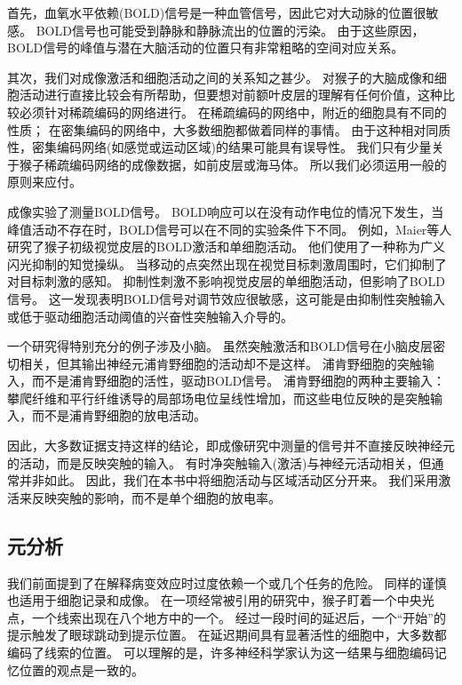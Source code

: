 \par
首先，血氧水平依赖(BOLD)信号是一种血管信号，因此它对大动脉的位置很敏感。
BOLD信号也可能受到静脉和静脉流出的位置的污染\cite{turner2002much}。
由于这些原因，BOLD信号的峰值与潜在大脑活动的位置只有非常粗略的空间对应关系\cite{kim2004spatial}。

\par
其次，我们对成像激活和细胞活动之间的关系知之甚少。
对猴子的大脑成像和细胞活动进行直接比较会有所帮助，但要想对前额叶皮层的理解有任何价值，这种比较必须针对稀疏编码的网络进行。
在稀疏编码的网络中，附近的细胞具有不同的性质；
在密集编码的网络中，大多数细胞都做着同样的事情。
由于这种相对同质性，密集编码网络(如感觉或运动区域)的结果可能具有误导性。
我们只有少量关于猴子稀疏编码网络的成像数据，如前皮层或海马体\cite{nakahara2002functional,orban2004comparative}。
所以我们必须运用一般的原则来应付。

\par
成像实验了测量BOLD信号。
BOLD响应可以在没有动作电位的情况下发生\cite{logothetis2002neural}，当峰值活动不存在时，BOLD信号可以在不同的实验条件下不同。
例如，Maier等人\cite{maier2008divergence}研究了猴子初级视觉皮层的BOLD激活和单细胞活动。
他们使用了一种称为广义闪光抑制的知觉操纵。
当移动的点突然出现在视觉目标刺激周围时，它们抑制了对目标刺激的感知。
抑制性刺激不影响视觉皮层的单细胞活动，但影响了BOLD信号。
这一发现表明BOLD信号对调节效应很敏感\cite{logothetis2008we}，这可能是由抑制性突触输入或低于驱动细胞活动阈值的兴奋性突触输入介导的。

\par
一个研究得特别充分的例子涉及小脑。
虽然突触激活和BOLD信号在小脑皮层密切相关，但其输出神经元浦肯野细胞的活动却不是这样\cite{thomsen2004principal}。
浦肯野细胞的突触输入，而不是浦肯野细胞的活性，驱动BOLD信号\cite{gold2002neuronal}。
浦肯野细胞的两种主要输入：攀爬纤维\cite{offenhauser2005activity}和平行纤维\cite{thomsen2009principal}诱导的局部场电位呈线性增加，而这些电位反映的是突触输入，而不是浦肯野细胞的放电活动。


\par
因此，大多数证据支持这样的结论，即成像研究中测量的信号并不直接反映神经元的活动，而是反映突触的输入。
有时净突触输入(激活)与神经元活动相关，但通常并非如此。
因此，我们在本书中将细胞活动与区域活动区分开来。
我们采用激活来反映突触的影响，而不是单个细胞的放电率\cite{logothetis2002neural}。


\subsection{元分析}
我们前面提到了在解释病变效应时过度依赖一个或几个任务的危险。
同样的谨慎也适用于细胞记录和成像。
在一项经常被引用的研究中\cite{funahashi1989mnemonic}，猴子盯着一个中央光点，一个线索出现在八个地方中的一个。
经过一段时间的延迟后，一个“开始”的提示触发了眼球跳动到提示位置。
在延迟期间具有显著活性的细胞中，大多数都编码了线索的位置。
可以理解的是，许多神经科学家认为这一结果与细胞编码记忆位置的观点是一致的。


